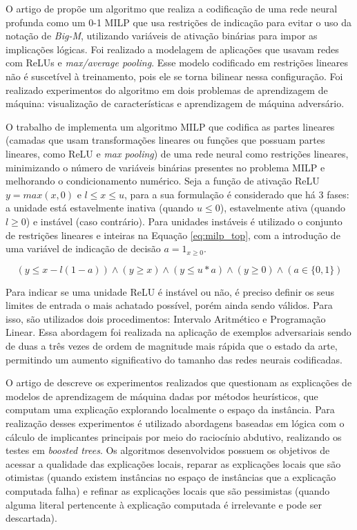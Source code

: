 O artigo de  propõe um algoritmo que realiza a codificação de uma rede neural profunda como um 0-1 MILP que usa restrições de indicação para evitar o uso da notação de \textit{Big-M}, utilizando variáveis de ativação binárias para impor as implicações lógicas. Foi realizado a modelagem de aplicações que usavam redes com ReLUs e \textit{max/average pooling}. Esse modelo codificado em restrições lineares não é suscetível à treinamento, pois ele se torna bilinear nessa configuração. Foi realizado experimentos do algoritmo em dois problemas de aprendizagem de máquina: visualização de características e aprendizagem de máquina adversário.

O trabalho de  implementa um algoritmo MILP que codifica as partes lineares (camadas que usam transformações lineares ou funções que possuam partes lineares, como ReLU e \textit{max pooling}) de uma rede neural como restrições lineares, minimizando o número de variáveis binárias presentes no problema MILP e melhorando o condicionamento numérico. Seja a função de ativação ReLU $y = max(x, 0)$ e $l \leq x \leq u$, para a sua formulação é considerado que há 3 fases: a unidade está estavelmente inativa (quando $u \leq 0$), estavelmente ativa (quando $l \geq 0$) e instável (caso contrário). Para unidades instáveis é utilizado o conjunto de restrições lineares e inteiras na Equação \ref{eq:milp_top}, com a introdução de uma variável de indicação de decisão $a = 1_{x \geq 0}$.

\begin{equation}
    (y \leq x - l(1- a)) \wedge (y \geq x) \wedge (y \leq u*a) \wedge (y \geq 0) \wedge (a \in \{0, 1\})
    \label{eq:milp_top}
\end{equation}

Para indicar se uma unidade ReLU é instável ou não, é preciso definir os seus limites de entrada o mais achatado possível, porém ainda sendo válidos. Para isso, são utilizados dois procedimentos: Intervalo Aritmético e Programação Linear. Essa abordagem foi realizada na aplicação de exemplos adversariais sendo de duas a três vezes de ordem de magnitude mais rápida que o estado da arte, permitindo um aumento significativo do tamanho das redes neurais codificadas.

O artigo de  descreve os experimentos realizados que questionam as explicações de modelos de aprendizagem de máquina dadas por métodos heurísticos, que computam uma explicação explorando localmente o espaço da instância. Para realização desses experimentos é utilizado abordagens baseadas em lógica com o cálculo de implicantes principais por meio do raciocínio abdutivo, realizando os testes em \textit{boosted trees}. Os algoritmos desenvolvidos possuem os objetivos de acessar a qualidade das explicações locais, reparar as explicações locais que são otimistas (quando existem instâncias no espaço de instâncias que a explicação computada falha) e refinar as explicações locais que são pessimistas (quando alguma literal pertencente à explicação computada é irrelevante e pode ser descartada).

